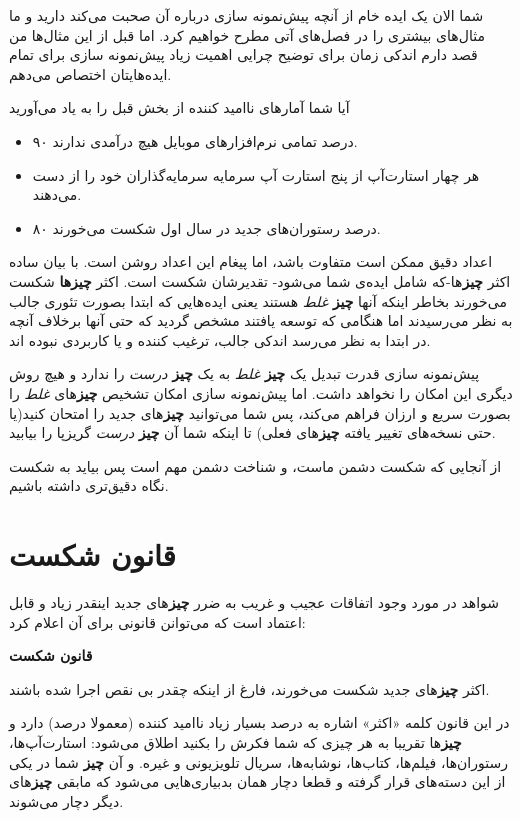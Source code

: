 شما الان یک ایده خام از آنچه پیش‌نمونه سازی درباره آن صحبت می‌کند دارید
و ما مثال‌های بیشتری را در فصل‌های آتی مطرح خواهیم کرد. اما قبل از این
مثال‌ها من قصد دارم اندکی زمان برای توضیح چرایی اهمیت زیاد پیش‌نمونه
سازی برای تمام ایده‌هایتان اختصاص می‌دهم.

آیا شما آمارهای ناامید کننده از بخش قبل را به یاد می‌آورید

\begin{itemize}

\item
  ۹۰ درصد تمامی نرم‌افزارهای موبایل هیچ درآمدی ندارند.
\item
  هر چهار استارت‌آپ از پنج استارت آپ سرمایه سرمایه‌گذاران خود را از دست
  می‌دهند.
\item
  ۸۰ درصد رستوران‌های جدید در سال اول شکست می‌خورند.
\end{itemize}

اعداد دقیق ممکن است متفاوت باشد، اما پیغام این اعداد روشن است. با بیان
ساده اکثر \textbf{چیز}ها-که شامل ایده‌ی شما می‌شود- تقدیرشان شکست است.
اکثر \textbf{چیزها} شکست می‌خورند بخاطر اینکه آنها \textbf{چیز}
\emph{غلط} هستند یعنی ایده‌هایی که ابتدا بصورت تئوری جالب به نظر
می‌رسیدند اما هنگامی که توسعه یافتند مشخص گردید که حتی آنها برخلاف آنچه
در ابتدا به نظر می‌رسد اندکی جالب، ترغیب کننده و یا کاربردی نبوده اند.

پیش‌نمونه سازی قدرت تبدیل یک \textbf{چیز} \emph{غلط} به یک \textbf{چیز}
\emph{درست} را ندارد و هیچ روش دیگری این امکان را نخواهد داشت. اما
پیش‌نمونه سازی امکان تشخیص \textbf{چیز}های \emph{غلط} را بصورت سریع و
ارزان فراهم می‌کند، پس شما می‌توانید \textbf{چیز}های جدید را امتحان
کنید(یا حتی نسخه‌های تغییر یافته \textbf{چیز}های فعلی) تا اینکه شما آن
\textbf{چیز} \emph{درست} گریزپا را بیابید.

از آنجایی که شکست دشمن ماست، و شناخت دشمن مهم است پس بیاید به شکست نگاه
دقیق‌تری داشته باشیم.

\section{قانون
شکست}\label{ux642ux627ux646ux648ux646-ux634ux6a9ux633ux62a}

شواهد در مورد وجود اتفاقات عجیب و غریب به ضرر \textbf{چیز}های جدید
اینقدر زیاد و قابل اعتماد است که می‌توانن قانونی برای آن اعلام کرد:

\textbf{قانون شکست}

اکثر \textbf{چیز}های جدید شکست می‌خورند، فارغ از اینکه چقدر بی نقص اجرا
شده باشند.

در این قانون کلمه «اکثر» اشاره به درصد بسیار زیاد ناامید کننده (معمولا
 درصد) دارد و \textbf{چیز}ها تقریبا به هر چیزی که شما فکرش
را بکنید اطلاق می‌شود: استارت‌آپ‌ها، رستوران‌ها، فیلم‌ها، کتاب‌ها،
نوشابه‌ها، سریال تلویزیونی و غیره. و آن \textbf{چیز} شما در یکی از این
دسته‌های قرار گرفته و قطعا دچار همان بدبیاری‌هایی می‌شود که مابقی
\textbf{چیز}های دیگر دچار می‌شوند.


